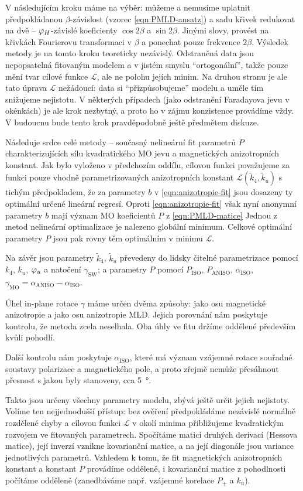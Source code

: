 V následujícím kroku máme na výběr: můžeme a nemusíme uplatnit předpokládanou $\beta$-závislost (vzorec \eqref{eqn:PMLD-ansatz}) a sadu křivek redukovat na dvě -- $\varphi_H$-závislé koeficienty $\cos2\beta$ a $\sin2\beta$.
Jinými slovy, provést na křivkách Fourierovu transformaci v $\beta$ a ponechat pouze frekvence $2\beta$.
Výsledek metody je na tomto kroku teoreticky nezávislý.
Odstraněná data jsou nepopsatelná fitovaným modelem a v jistém smyslu ``ortogonální'', takže pouze mění tvar cílové funkce $\mathcal{L}$, ale ne polohu jejích minim.
Na druhou stranu je ale tato úprava $\mathcal{L}$ nežádoucí: data si ``přizpůsobujeme'' modelu a uměle tím snižujeme nejistotu.
V některých případech (jako odstranění Faradayova jevu v okénkách) je ale krok nezbytný, a proto ho v zájmu konzistence provádíme vždy.
V budoucnu bude tento krok pravděpodobně ještě předmětem diskuze.

Následuje srdce celé metody -- současný nelineární fit parametrů $P$ charakterizujících sílu kvadratického MO jevu a magnetických anizotropních konstant.
Jak bylo vyloženo v předchozím oddílu, cílovou funkci považujeme za funkci pouze vhodně parametrizovaných anizotropních konstant $\mathcal{L}(\tilde{k}_4, \tilde{k}_u)$ s tichým předpokladem, že za parametry $b$ v \eqref{eqn:anizotropie-fit} jsou dosazeny ty optimální určené lineární regresí.
Oproti \eqref{eqn:anizotropie-fit} však nyní anonymní parametry $b$ mají význam MO koeficientů $P$ z \eqref{eqn:PMLD-matice}
Jednou z metod nelineární optimalizace je nalezeno globální minimum.
Celkové optimální parametry $P$ jsou pak rovny těm optimálním v minimu $\mathcal{L}$.

Na závěr jsou parametry $\tilde{k}_4$, $\tilde{k}_u$ převedeny do lidsky čitelné parametrizace pomocí $k_4$, $k_u$, $\varphi_u$ a natočení $\gamma_\textrm{SW}$; a parametry $P$ pomocí $P_\textrm{ISO}$, $P_\textrm{ANISO}$, $\alpha_\textrm{ISO}$, $\gamma_\textrm{MO}=\alpha_\textrm{ANISO}-\alpha_\textrm{ISO}$.

Úhel in-plane rotace $\gamma$ máme určen dvěma způsoby: jako osu magnetické anizotropie a jako osu anizotropie MLD.
Jejich porovnání nám poskytuje kontrolu, že metoda zcela neselhala.
Oba úhly ve fitu držíme oddělené především kvůli pohodlí.

Další kontrolu nám poskytuje $\alpha_\textrm{ISO}$, které má význam vzájemné rotace souřadné soustavy polarizace a magnetického pole, a proto zřejmě nemůže přesáhnout přesnost s jakou byly stanoveny, cca \SI{5}{\degree}.

Takto jsou určeny všechny parametry modelu, zbývá ještě určit jejich nejistoty.
Volíme ten nejjednodušší přístup: bez ověření předpokládáme nezávislé normálně rozdělené chyby a cílovou funkci $\mathcal{L}$ v okolí minima přibližujeme kvadratickým rozvojem ve fitovaných parametrech.
Spočítáme matici druhých derivací (Hessova matice), její inverzí vznikne kovarianční matice, a na její diagonále jsou variance jednotlivých parametrů.
Vzhledem k tomu, že fit magnetických anizotropních konstant a konstant $P$ provádíme odděleně, i kovarianční matice z pohodlnosti počítáme odděleně (zanedbáváme např. vzájemné korelace $P_+$ a $k_u$).

